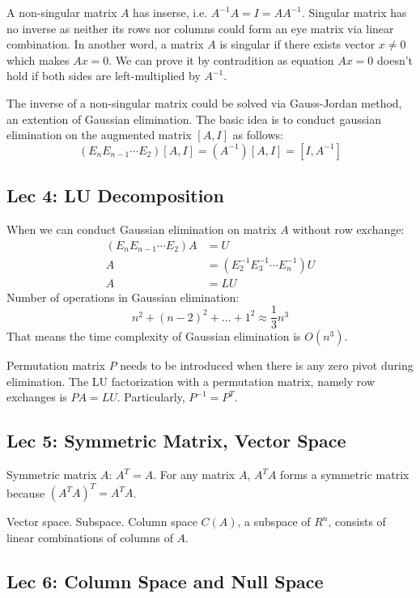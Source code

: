 A non-singular matrix $A$ has inserse, i.e. $A^{-1}A=I=AA^{-1}$. Singular
matrix has no inverse as neither its rows nor columns could form an eye matrix
via linear combination. In another word, a matrix $A$ is singular if there
exists vector $x\ne 0$ which makes $Ax=0$. We can prove it by contradition
as equation $Ax=0$ doesn't hold if both sides are left-multiplied by $A^{-1}$.

The inverse of a non-singular matrix could be solved via Gauss-Jordan method,
an extention of Gaussian elimination. The basic idea is to conduct gaussian
elimination on the augmented matrix $[A,I]$ as follows:
$$ (E_n E_{n-1} \cdots E_2) [A,I] = (A^{-1}) [A,I] = [I, A^{-1}] $$

\subsection{Lec 4: LU Decomposition}

When we can conduct Gaussian elimination on matrix $A$ without row exchange:
\begin{align}
	(E_n E_{n-1} \cdots E_2) A &= U \\
	A &= (E_2^{-1} E_3^{-1} \cdots E_n^{-1}) U \\
	A &= LU
\end{align}
Number of operations in Gaussian elimination:
$$ n^2 + (n-2)^2 + \ldots + 1^2 \approx \frac{1}{3}n^3 $$
That means the time complexity of Gaussian elimination is $O(n^3)$.

Permutation matrix $P$ needs to be introduced when there is any zero pivot during
elimination. The LU factorization with a permutation matrix, namely row exchanges
is $PA=LU$. Particularly, $P^{-1} = P^T$.

\subsection{Lec 5: Symmetric Matrix, Vector Space}

Symmetric matrix $A$: $A^T=A$. For any matrix $A$, $A^TA$ forms a symmetric
matrix because $(A^TA)^T=A^TA$.

Vector space. Subspace. Column space $C(A)$, a subspace of $R^n$, consists of
linear combinations of columns of $A$.

\subsection{Lec 6: Column Space and Null Space}


